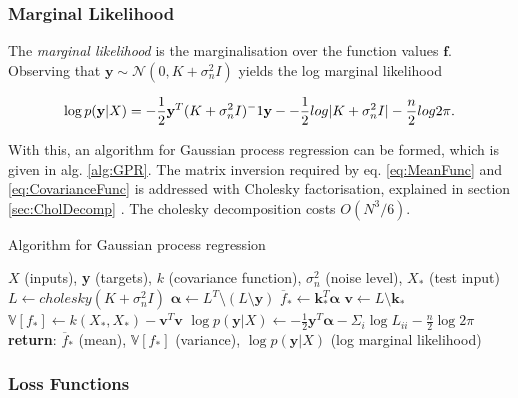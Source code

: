\documentclass[12pt,a4paper]{report}
\theoremstyle{definition}
\begin{document}
\subsubsection{Marginal Likelihood}

The \emph{marginal likelihood} is the marginalisation over the function values $\textbf{f}$. 
Observing that $\textbf{y} \sim \mathcal{N} (0, K + \sigma_{n}^2I)$ yields the log marginal likelihood

\begin{equation}
	\label{eq:LogMargLik}
	\centering
	\log p(\textbf{y} | X) = -\frac{1}{2}\textbf{y}^T(K +  \sigma_{n}^2I)^-1\textbf{y} - -\frac{1}{2}log|K +  \sigma_{n}^2I| - \frac{n}{2}log2\pi.
\end{equation}

With this, an algorithm for Gaussian process regression can be formed, which is given in alg. \ref{alg:GPR}. The matrix inversion required by eq. \ref{eq:MeanFunc} and \ref{eq:CovarianceFunc} is addressed with Cholesky factorisation, explained in section \ref{sec:CholDecomp} \citep{RasmussenWilliams2006}. The cholesky decomposition costs $O(N^3/6)$.

\begin{algorithm}
	\caption{Algorithm for Gaussian process regression \citep{RasmussenWilliams2006}}
	\label{alg:GPR}
	\begin{algorithmic}[1]
		\Require $X$ (inputs), \textbf{y} (targets), $k$ (covariance function), $\sigma_{n}^2$ (noise level), $X_{*}$ (test input)	
		\State $L \gets cholesky(K +\sigma_{n}^2I)$
		\State $\boldsymbol{\alpha} \gets L^T \setminus (L \setminus \textbf{y})$ 
		\State $\overline{f}_{*} \gets \textbf{k}_{*}^T \boldsymbol{\alpha}$ 
		\State $\textbf{v} \gets L \setminus \textbf{k}_{*}$ 
		\State $\mathbb{V}[f_{*}] \gets k(X_{*}, X_{*}) - \textbf{v}^T\textbf{v}$ 
		\State $\log p(\textbf{y} | X) \gets -\frac{1}{2} \textbf{y}^T \boldsymbol{\alpha} - \Sigma_{i} \log L_{ii} - \frac{n}{2} \log2\pi$ 
		\State \textbf{return}: $\overline{f}_{*}$ (mean), $\mathbb{V}[f_{*}]$ (variance), $\log p(\textbf{y} | X)$ (log marginal likelihood)
	\end{algorithmic}
\end{algorithm}

\subsubsection{Loss Functions}
\end{document}
